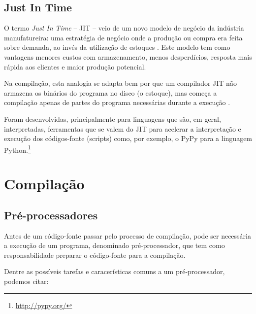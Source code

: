 \subsection{Just In Time}

O termo \textit{Just In Time} -- JIT -- veio de um novo modelo de  negócio da
 indústria manufatureira: uma estratégia de negócio onde a produção 
ou compra era feita sobre demanda, ao invés da utilização de estoques
 \cite{ref10}. 
Este modelo tem como vantagens menores custos com armazenamento, 
menos desperdícios, resposta mais rápida aos clientes e maior 
produção potencial.

Na compilação, esta analogia se adapta bem por que um compilador JIT 
não armazena os binários do programa no disco (o estoque), mas começa 
a compilação apenas de partes do programa necessárias durante a execução
 \cite{ref11}.

Foram desenvolvidas, principalmente para linguagens que são, em geral, 
interpretadas, ferramentas que se valem do JIT para acelerar a interpretação
 e execução dos códigos-fonte (scripts) como, 
por exemplo, o PyPy para a linguagem Python.\footnote{\url{http://pypy.org/}}


\section{Compilação}

\subsection{Pré-processadores}


Antes de um código-fonte passar pelo processo de compilação, pode ser
 necessária a execução de um programa, denominado pré-processador, que
 tem como responsabilidade preparar o código-fonte para a compilação. 

Dentre as possíveis tarefas e caracerísticas comuns a um pré-processador,
 podemos citar:

